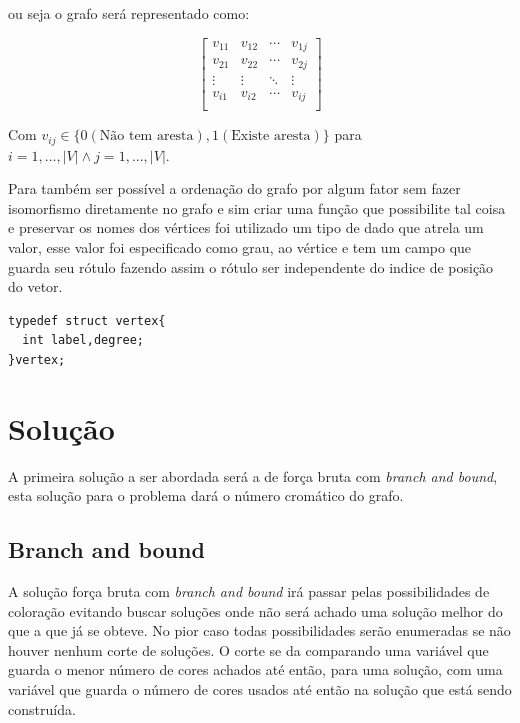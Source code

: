 \documentclass[12pt]{article}
\begin{document}
ou seja o grafo será representado como:

\begin{equation}
\begin{bmatrix}
 v_{11} & v_{12} & \cdots & v_{1j} \\
 v_{21} & v_{22} & \cdots & v_{2j} \\
 \vdots & \vdots & \ddots & \vdots \\
 v_{i1} & v_{i2} & \cdots & v_{ij} \\
\end{bmatrix}
\end{equation}

Com \(v_{ij} \in \{0(\text{Não tem aresta}),1(\text{Existe aresta})\}\) para \(i=1,...,|V| \land j=1,...,|V|\).

Para também ser possível a ordenação do grafo por algum fator sem fazer isomorfismo diretamente no grafo e sim criar uma função que possibilite tal coisa e preservar os nomes dos vértices foi utilizado um tipo de dado que atrela um valor, esse valor foi especificado como grau, ao vértice e tem um campo que guarda seu rótulo fazendo assim o rótulo ser independente do indice de posição do vetor.

\begin{verbatim}
typedef struct vertex{
  int label,degree;
}vertex;
\end{verbatim}


\section{Solução}
\label{sec:orge73f8db}

A primeira solução a ser abordada será a de força bruta com \emph{branch and bound}, esta solução para o problema dará o número cromático do grafo.

\subsection{Branch and bound}
\label{sec:orgee72969}

A solução força bruta com \emph{branch and bound} irá passar pelas possibilidades de coloração evitando buscar soluções onde não será achado uma solução melhor do que a que já se obteve. No pior caso todas possibilidades serão enumeradas se não houver nenhum corte de soluções. O corte se da comparando uma variável que guarda o menor número de cores achados até então, para uma solução, com uma variável que guarda o número de cores usados até então na solução que está sendo construída.
\end{document}
